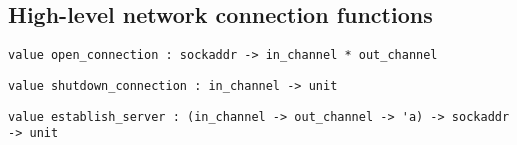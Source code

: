 \subsection*{High-level network connection functions }\begin{verbatim}
value open_connection : sockaddr -> in_channel * out_channel
\end{verbatim}
%
\begin{comment}
 Connect to a server at the given address.
           Return a pair of buffered channels connected to the server.
           Remember to call \verbflush on the output channel at the right times
           to ensure correct synchronization. 
\end{comment}
\begin{verbatim}
value shutdown_connection : in_channel -> unit
\end{verbatim}
%
\begin{comment}
 ``Shut down'' a connection established with \verbopen_connection;
           that is, transmit an end-of-file condition to the server reading
           on the other side of the connection. 
\end{comment}
\begin{verbatim}
value establish_server : (in_channel -> out_channel -> 'a) -> sockaddr -> unit
\end{verbatim}
%
\begin{comment}
 Establish a server on the given address.
           The function given as first argument is called for each connection
           with two buffered channels connected to the client. A new process
           is created for each connection. The function \verbestablish_server
           never returns normally. 
\end{comment}
